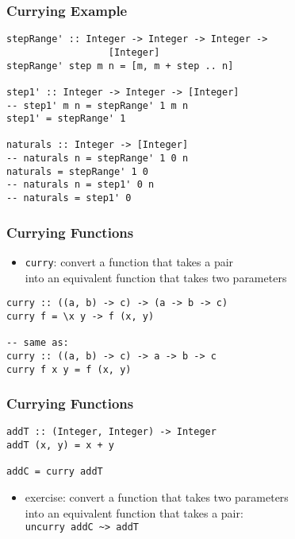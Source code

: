\documentclass[dvipsnames]{beamer}
\theoremstyle{plain}
\begin{document}
\begin{frame}[fragile]
  \frametitle{Currying Example}

  \begin{exampleblock}{}
    \begin{lstlisting}
stepRange' :: Integer -> Integer -> Integer ->
                  [Integer]
stepRange' step m n = [m, m + step .. n]

step1' :: Integer -> Integer -> [Integer]
-- step1' m n = stepRange' 1 m n
step1' = stepRange' 1

naturals :: Integer -> [Integer]
-- naturals n = stepRange' 1 0 n
naturals = stepRange' 1 0
-- naturals n = step1' 0 n
-- naturals = step1' 0
    \end{lstlisting}
  \end{exampleblock}
\end{frame}

\begin{frame}[fragile]
  \frametitle{Currying Functions}

  \begin{itemize}
    \item \lstinline|curry|: convert a function that takes a pair\\
      into an equivalent function that takes two parameters
  \end{itemize}

  \begin{lstlisting}[deletekeywords={curry}]
curry :: ((a, b) -> c) -> (a -> b -> c)
curry f = \x y -> f (x, y)

-- same as:
curry :: ((a, b) -> c) -> a -> b -> c
curry f x y = f (x, y)
  \end{lstlisting}
\end{frame}

\begin{frame}[fragile]
  \frametitle{Currying Functions}

  \begin{exampleblock}{}
    \begin{lstlisting}
addT :: (Integer, Integer) -> Integer
addT (x, y) = x + y

addC = curry addT
    \end{lstlisting}
  \end{exampleblock}

  \begin{itemize}
    \item exercise: convert a function that takes two parameters\\
      into an equivalent function that takes a pair:\\
      \lstinline|uncurry addC ~> addT|
  \end{itemize}
\end{frame}
\end{document}
